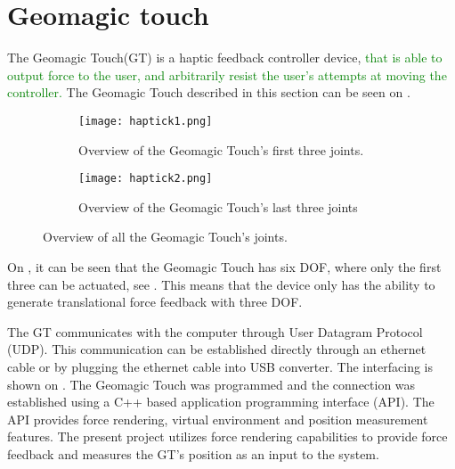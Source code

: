 \section{Geomagic touch}\label{sec:geo_magic}
The Geomagic Touch(GT) is a haptic feedback controller device, %
\textcolor{green}{that is able to output force to the user, and arbitrarily resist the user's attempts at moving the controller.
	} The Geomagic Touch described in this section can be seen on .

\begin{figure}[H]
	\centering
	\begin{subfigure}{.45\textwidth}
		\centering
		\texttt{[image: haptick1.png]}
		\caption{Overview of the Geomagic Touch's first three joints.}
		\label{fig:phantom1}
	\end{subfigure}
	\begin{subfigure}{.45\textwidth}
		\centering
		\texttt{[image: haptick2.png]}
		\caption{Overview of the Geomagic Touch's last three joints}
		\label{fig:phantom2}
	\end{subfigure}
\caption{Overview of all the Geomagic Touch's joints.}
\label{fig:phantom_omni}
\end{figure}

 On , it can be seen that the Geomagic Touch has six \gls{DOF}, where only the first three can be actuated, see . This means that the device only has the ability to generate translational force feedback with three \gls{DOF}.%

The GT communicates with the computer through User Datagram Protocol (UDP). This communication can be established directly through an ethernet cable or by plugging the ethernet cable into USB converter. The interfacing is shown on . The Geomagic Touch was programmed and the connection was established using a C++ based application programming interface (API). The API provides force rendering,  virtual environment and position measurement features. The present project utilizes force rendering capabilities to provide force feedback and measures the GT's position as an input to the system.